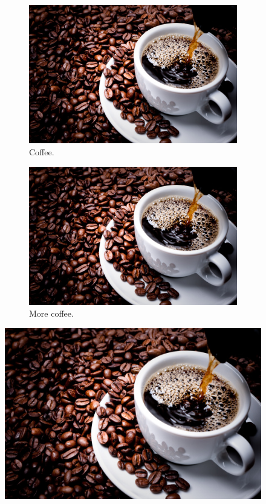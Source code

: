 \documentclass{article}
\begin{document}
	\begin{figure}[h!]
		\centering
		\begin{subfigure}[b]{0.2/linewidth}
			\includegraphics[width=\linewidth]{coffe.jpg}
			\caption{Coffee.}
		\end{subfigure}
		\begin{subfigure}[b]{0.2\linewidth}
			
			\includegraphics[width=\line]{coffe.jpg}
			\caption{More coffee.}
		\end{subfigure}
		\includegraphics[width=\linewidth]{coffe.jpg}
		\caption{ More Coffee.}
			\begin{subfigure}[b]{0.2\linewidth}
			

\end{subfigure}
\end{figure}
\end{document}
